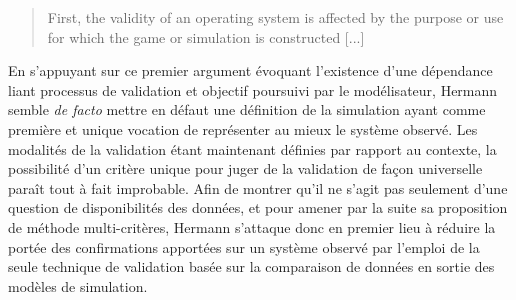 \foreignblockquote{english}[{\cite[217]{Hermann1967}}]{First, the validity of an operating system is affected by the purpose or use for which the game or simulation is constructed [...]}




En s'appuyant sur ce premier argument évoquant l'existence d'une dépendance liant processus de validation et objectif poursuivi par le modélisateur, Hermann semble \textit{de facto} mettre en défaut une définition de la simulation ayant comme première et unique vocation de représenter au mieux le système observé. Les modalités de la validation étant maintenant définies par rapport au contexte, la possibilité d'un critère unique pour juger de la validation de façon universelle paraît tout à fait improbable. Afin de montrer qu'il ne s'agit pas seulement d'une question de disponibilités des données, et pour amener par la suite sa proposition de méthode multi-critères, Hermann s'attaque donc en premier lieu à réduire la portée des confirmations apportées sur un système observé par l'emploi de la seule technique de validation basée sur la comparaison de données en sortie des modèles de simulation.

